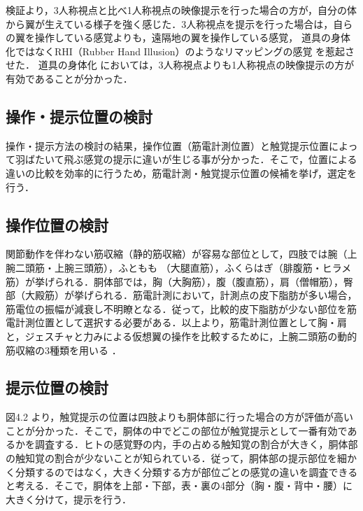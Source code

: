 \begin{small}
      検証より，3人称視点と比べ1人称視点の映像提示を行った場合の方が，自分の体から翼が生えている様子を強く感じた．3人称視点を提示を行った場合は，自らの翼を操作している感覚よりも，遠隔地の翼を操作している感覚，
      道具の身体化ではなくRHI（Rubber Hand Illusion）のようなリマッピングの感覚
      を惹起させた．
      道具の身体化
      においては，3人称視点よりも1人称視点の映像提示の方が有効であることが分かった．
  
  \subsection{操作・提示位置の検討}
    操作・提示方法の検討の結果，操作位置（筋電計測位置）と触覚提示位置によって羽ばたいて飛ぶ感覚の提示に違いが生じる事が分かった．そこで，位置による違いの比較を効率的に行うため，筋電計測・触覚提示位置の候補を挙げ，選定を行う．
  
    \subsection{操作位置の検討} %
      
      関節動作を伴わない筋収縮（静的筋収縮）が容易な部位として，四肢では腕（上腕二頭筋・上腕三頭筋），ふともも
      （大腿直筋），ふくらはぎ（腓腹筋・ヒラメ筋）が挙げられる．胴体部では，胸（大胸筋），腹（腹直筋），肩（僧帽筋），臀部（大殿筋）が挙げられる．筋電計測において，計測点の皮下脂肪が多い場合，筋電位の振幅が減衰し不明瞭となる\cite{白石恵1992筋電位多点計測による体幹背部の神経支配帯の分布}．従って，比較的皮下脂肪が少ない部位を筋電計測位置として選択する必要がある．以上より，筋電計測位置として胸・肩と，ジェスチャと力みによる仮想翼の操作を比較するために，上腕二頭筋の動的筋収縮の3種類を用いる
      ．

    \subsection{提示位置の検討} %
      図4.2
      より，触覚提示の位置は四肢よりも胴体部に行った場合の方が評価が高いことが分かった．そこで，胴体の中でどこの部位が触覚提示として一番有効であるかを調査する．ヒトの感覚野の内，手の占める触知覚の割合が大きく\cite{penfield1950cerebral}，胴体部の触知覚の割合が少ない\cite{gibson1962observations}\cite{丸本耕次1997触覚表示の認知特性に関する研究}\cite{杉輝夫2005身体部位による触知覚の差}ことが知られている．従って，胴体部の提示部位を細かく分類するのではなく，大きく分類する方が部位ごとの感覚の違いを調査できると考える．そこで，胴体を上部・下部，表・裏の4部分（胸・腹・背中・腰）に大きく分けて，提示を行う．        


\end{small}
